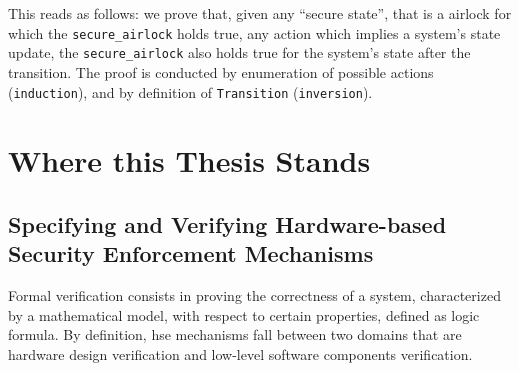 \documentclass[oneside,a4paper]{memoir}
\theoremstyle{break}
\begin{document}
\inputminted[firstline=40,lastline=57]{coq}{Listings/Airlock.v}

This reads as follows: we prove that, given any ``secure state'', that is a
airlock for which the \texttt{secure\_airlock} holds true, any action which
implies a system's state update, the \texttt{secure\_airlock} also holds true
for the system's state after the transition.
%
The proof is conducted by enumeration of possible actions (\texttt{induction}),
and by definition of \texttt{Transition} (\texttt{inversion}).







\section{Where this Thesis Stands}

\subsection{Specifying and Verifying Hardware-based Security Enforcement
  Mechanisms}

Formal verification consists in proving the correctness of a system,
characterized by a mathematical model, with respect to certain properties,
defined as logic formula.
%
By definition, \ac{hse} mechanisms fall between two domains that are hardware
design verification and low-level software components verification.
\end{document}
